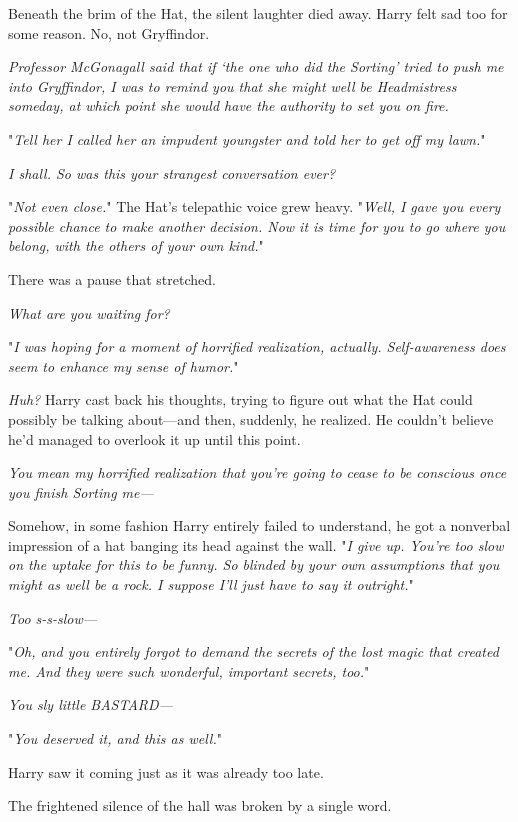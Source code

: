 Beneath the brim of the Hat, the silent laughter died away. Harry felt sad too
for some reason. No, not Gryffindor.

\emph{Professor McGonagall said that if `the one who did the Sorting' tried to
push me into Gryffindor, I was to remind you that she might well be
Headmistress someday, at which point she would have the authority to set you on
fire.}

"\emph{Tell her I called her an impudent youngster and told her to get off my
lawn.}"

\emph{I shall. So was this your strangest conversation ever?}

"\emph{Not even close.}" The Hat's telepathic voice grew heavy. "\emph{Well, I
gave you every possible chance to make another decision. Now it is time for you
to go where you belong, with the others of your own kind.}"

There was a pause that stretched.

\emph{What are you waiting for?}

"\emph{I was hoping for a moment of horrified realization, actually.
Self-awareness does seem to enhance my sense of humor.}"

\emph{Huh?} Harry cast back his thoughts, trying to figure out what the Hat
could possibly be talking about---and then, suddenly, he realized. He couldn't
believe he'd managed to overlook it up until this point.

\emph{You mean my horrified realization that you're going to cease to be
conscious once you finish Sorting me---}

Somehow, in some fashion Harry entirely failed to understand, he got a
nonverbal impression of a hat banging its head against the wall. "\emph{I give
up. You're too slow on the uptake for this to be funny. So blinded by your own
assumptions that you might as well be a rock. I suppose I'll just have to say
it outright.}"

\emph{Too s-s-slow---}

"\emph{Oh, and you entirely forgot to demand the secrets of the lost magic that
created me. And they were such wonderful, important secrets, too.}"

\emph{You sly little BASTARD---}

"\emph{You deserved it, and this as well.}"

Harry saw it coming just as it was already too late.

The frightened silence of the hall was broken by a single word.

